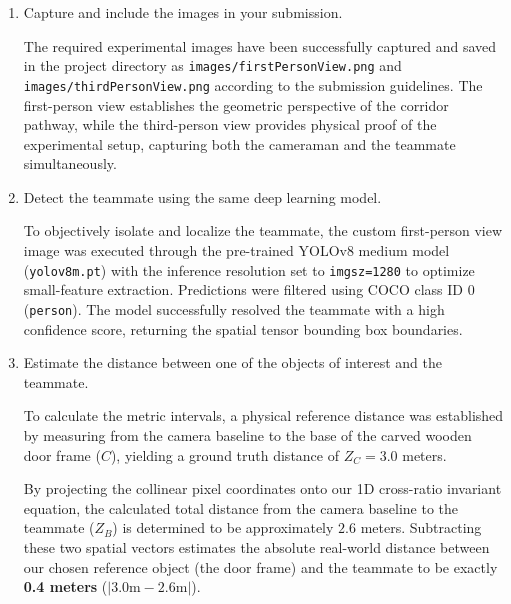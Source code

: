 \begin{enumerate}
\item Capture and include the images in your submission.

\begin{studentSpace}
The required experimental images have been successfully captured and saved in the project directory as \texttt{images/firstPersonView.png} and \texttt{images/thirdPersonView.png} according to the submission guidelines. The first-person view establishes the geometric perspective of the corridor pathway, while the third-person view provides physical proof of the experimental setup, capturing both the cameraman and the teammate simultaneously.
\end{studentSpace}

\item Detect the teammate using the same deep learning model.

\begin{studentSpace}
To objectively isolate and localize the teammate, the custom first-person view image was executed through the pre-trained YOLOv8 medium model (\texttt{yolov8m.pt}) with the inference resolution set to \texttt{imgsz=1280} to optimize small-feature extraction. Predictions were filtered using COCO class ID 0 (\texttt{person}). The model successfully resolved the teammate with a high confidence score, returning the spatial tensor bounding box boundaries.
\end{studentSpace}

\item Estimate the distance between one of the objects of interest and the teammate.

\begin{studentSpace}
To calculate the metric intervals, a physical reference distance was established by measuring from the camera baseline to the base of the carved wooden door frame ($C$), yielding a ground truth distance of $Z_C = 3.0$ meters. 

By projecting the collinear pixel coordinates onto our 1D cross-ratio invariant equation, the calculated total distance from the camera baseline to the teammate ($Z_B$) is determined to be approximately $2.6$ meters. Subtracting these two spatial vectors estimates the absolute real-world distance between our chosen reference object (the door frame) and the teammate to be exactly \textbf{0.4 meters} ($|3.0\text{m} - 2.6\text{m}|$).
\end{studentSpace}
\end{enumerate}

